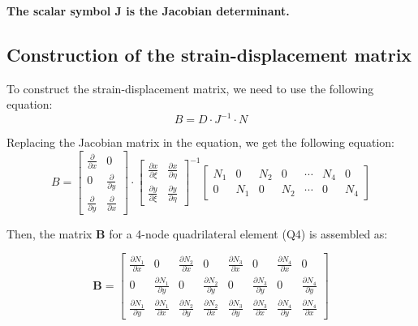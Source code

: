 \documentclass{article}  %
\begin{document}
\textbf{The scalar symbol J is the Jacobian determinant.}

\subsection{Construction of the strain-displacement matrix}

To construct the strain-displacement matrix, we need to use the following equation:
\begin{equation}
  B = D \cdot J^{-1} \cdot N
\end{equation}

Replacing the Jacobian matrix in the equation, we get the following equation:
\begin{equation}
  B =   \begin{bmatrix}
    \frac{\partial}{\partial x} & 0 \\
    0 & \frac{\partial}{\partial y} \\
    \frac{\partial}{\partial y} & \frac{\partial}{\partial x}
        \end{bmatrix}
 \cdot 
  \begin{bmatrix}
    \frac{\partial x}{\partial \xi} & \frac{\partial x}{\partial \eta} \\
    \frac{\partial y}{\partial \xi} & \frac{\partial y}{\partial \eta}
  \end{bmatrix}^{-1} 
  \begin{bmatrix}
    N_1 & 0     & N_2 & 0 & \cdots &N_4 & 0     \\
    0     & N_1 & 0 & N_2 & \cdots &0     & N_4
  \end{bmatrix}
\end{equation}

Then, the matrix \( \boldsymbol{B} \) for a 4-node quadrilateral element (Q4) is assembled as:

\[
\boldsymbol{B} =
\begin{bmatrix}
\frac{\partial N_1}{\partial x} & 0 & \frac{\partial N_2}{\partial x} & 0 & \frac{\partial N_3}{\partial x} & 0 & \frac{\partial N_4}{\partial x} & 0 \\
0 & \frac{\partial N_1}{\partial y} & 0 & \frac{\partial N_2}{\partial y} & 0 & \frac{\partial N_3}{\partial y} & 0 & \frac{\partial N_4}{\partial y} \\
\frac{\partial N_1}{\partial y} & \frac{\partial N_1}{\partial x} & \frac{\partial N_2}{\partial y} & \frac{\partial N_2}{\partial x} & \frac{\partial N_3}{\partial y} & \frac{\partial N_3}{\partial x} & \frac{\partial N_4}{\partial y} & \frac{\partial N_4}{\partial x}
\end{bmatrix}
\]
\end{document}
